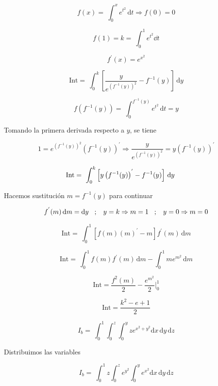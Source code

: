 {%

$$
f(x)=\ \int_{0}^{ x } e^{t^2} \, \mathrm{d}t \Rightarrow f(0)=0
$$

$$
f(1)=k=\ \int_{0}^{ 1 } e^{t^2}\dd{t}
$$

$$
f^{'}(x)=e^{x^2} 
$$



$$ 
\mathrm{Int}= \ \int_{0}^{ k } \left[ \frac{y}{e^{(f^{-1} (y))^2}} -f^{-1} (y) \right]\, \mathrm{d} y   
$$

$$
f(f^{-1} (y))=\ \int_{0}^{ f^{-1} (y) } e^{t^2} \, \mathrm{d}t =y
$$

Tomando la primera derivada respecto a $y$, se tiene

$$
1=e^{(f^{-1} (y))^2} \left(f^{-1} (y) \right)^{'}  
\Rightarrow \frac{y}{e^{(f^{-1} (y))^2}} =y \left(f^{-1} (y) \right)^{'}
$$

$$
\mathrm{Int}= \ \int_{0}^{ k } \left[ y \left(f^{-1} (y) \right)^{'} -f^{-1} (y) \right]\, \mathrm{d} y  \hspace{.3 cm}  \hspace{.3 cm} 
$$

Hacemos sustitución $ m=f^{-1} (y)$ para continuar

$$
f^{'} (m) \, \mathrm{d} m= \mathrm{d}y \hspace{.3 cm};  \hspace{.3 cm} y=k \Rightarrow m=1 \hspace{.3 cm};  \hspace{.3 cm} y=0 \Rightarrow m=0
$$

$$
\mathrm{Int}= \ \int_{0}^{ 1 } \left[ f(m) \left(m \right)^{'} -m \right] f^{'} (m) \, \mathrm{d} m
$$

$$
\mathrm{Int}= \ \int_{0}^{ 1 }  f(m) f^{'} (m) \, \mathrm{d} m -\int_{0}^{ 1 } m e^{m^2} \, \mathrm{d} m 
$$

$$
\mathrm{Int}= \frac{f^2 (m)}{2} -\frac{e^{m^2}}{2} \bigg\rvert_0^1 
$$

\begin{LnxRptaBox}
$$ 
\mathrm{Int}= \frac{k^2 -e+1}{2}
$$
\end{LnxRptaBox}

 
$$
I_b= \ \int_{0}^{ 1 } \int_{0}^{ z } \int_{0}^{ y }  ze^{x^2+y^2}  \mathrm{d} x \,  \mathrm{d} y \,  \mathrm{d} z 
$$

Distribuimos las variables  

$$
I_b= \ \int_{0}^{ 1 } z \int_{0}^{ z } e^{y^2} \int_{0}^{ y }  e^{x^2}  \mathrm{d} x \,  \mathrm{d} y \, \mathrm{d} z     
$$

}
